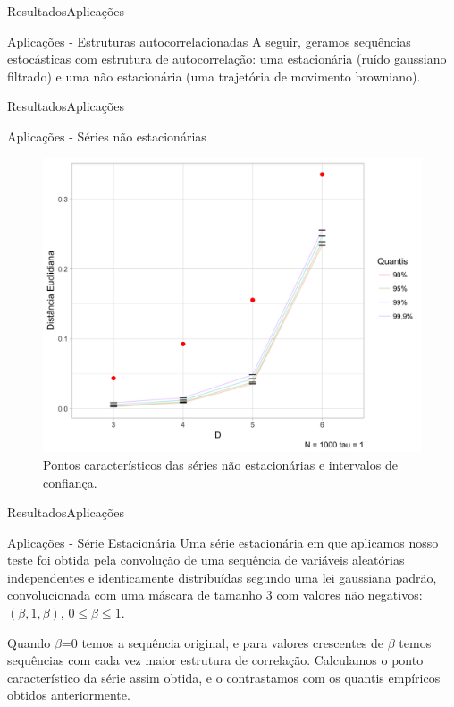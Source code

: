 \documentclass[10pt,xcolor={dvipsnames}]{beamer}
\begin{document}
\begin{frame}{Resultados}{Aplicações}
	\begin{block}{Aplicações - Estruturas autocorrelacionadas}
	A seguir, geramos sequências estocásticas com estrutura de autocorrelação: uma estacionária (ruído gaussiano filtrado) e uma não estacionária (uma trajetória de movimento browniano).
	\end{block}
\end{frame}

\begin{frame}{Resultados}{Aplicações}
	\begin{block}{Aplicações - Séries não estacionárias}
		\begin{figure}
		\centering
		\includegraphics[width=.65\linewidth]{ConfidInt_nao_estacionaria_1k_t1}
		\caption{Pontos característicos das séries não estacionárias e intervalos de confiança.}\label{Fig:ConfidInt_nao_estacionaria_1k_t1}
		\end{figure}
	\end{block}
\end{frame}

\begin{frame}{Resultados}{Aplicações}
	\begin{block}{Aplicações - Série Estacionária}
	Uma série estacionária em que aplicamos nosso teste foi obtida pela convolução de uma sequência de variáveis aleatórias independentes e identicamente distribuídas segundo uma lei gaussiana padrão, convolucionada com uma máscara de tamanho \num{3} com valores não negativos: $(\beta,1,\beta)$, $0\leq \beta\leq 1$.
	\pause
	
	Quando $\beta$=\num{0} temos a sequência original, e para valores crescentes de $\beta$ temos sequências com cada vez maior estrutura de correlação.
	Calculamos o ponto característico da série assim obtida, e o contrastamos com os quantis empíricos obtidos anteriormente.	
	\end{block}
\end{frame}
\end{document}
